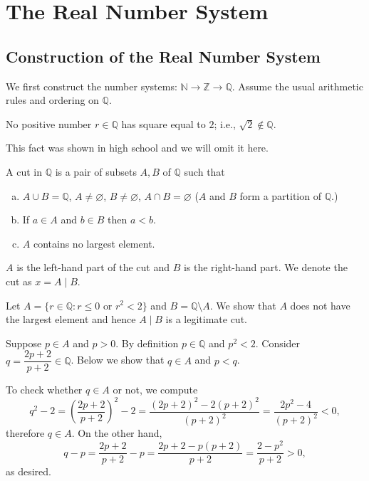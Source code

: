 \chapter{The Real Number System}
\label{chap:real-number}

\section{Construction of the Real Number System}
We first construct the number systems: $\mathbb N \to \mathbb Z \to \mathbb Q$.
Assume the usual arithmetic rules and ordering on $\mathbb Q$.

\begin{thm}
  No positive number $r \in \mathbb Q$ has square equal to $2$; i.e., $\sqrt{2} \notin \mathbb Q$.
\end{thm}

This fact was shown in high school and we will omit it here.

\begin{defn}
  A \textsf{cut} in $\mathbb Q$ is a pair of subsets $A, B$ of $\mathbb Q$ such that
  \begin{enumerate}[(a)]
    \item $A \cup B = \mathbb Q$, $A \ne \varnothing$, $B \ne \varnothing$, $A \cap B = \varnothing$ ($A$ and $B$ form a partition of $\mathbb Q$.)
    \item If $a \in A$ and $b \in B$ then $a < b$.
    \item $A$ contains no largest element.
  \end{enumerate}
\end{defn}

$A$ is the left-hand part of the cut and $B$ is the right-hand part.
We denote the cut as $x = A \mid B$. 

\begin{example}
  Let $A = \{ r \in \mathbb Q \colon r \leqslant 0 \text{ or } r^2 < 2 \}$ and $B = \mathbb Q \setminus A$.  We show that $A$ does not have the largest element and hence $A \mid B$ is a legitimate cut.

  Suppose $p \in A$ and $p > 0$.  By definition $p \in \mathbb{Q}$ and $p^2 < 2$.
  Consider $q = \dfrac{2p+2}{p+2} \in \mathbb{Q}$.  Below we show that $q \in A$ and $p < q$.

  To check whether $q \in A$ or not, we compute
  \begin{equation*}
    q^2 - 2 = \left( \frac{2p+2}{p+2} \right)^2 - 2 = \frac{(2p+2)^2-2(p+2)^2}{(p+2)^2} = \frac{2p^2 - 4}{(p+2)^2} < 0,
  \end{equation*}
  therefore $q \in A$.  On the other hand,
  \begin{equation*}
    q - p = \frac{2p+2}{p+2} - p = \frac{2p+2 - p(p+2)}{p+2} = \frac{2-p^2}{p+2} > 0,
  \end{equation*}
  as desired.
\end{example}

